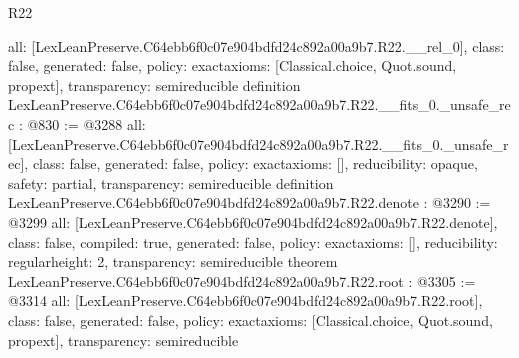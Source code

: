 \begin{lexlean}{R22}
\begin{coremodule}
{  all: [LexLeanPreserve.C64ebb6f0c07e904bdfd24c892a00a9b7.R22.__rel_0],
  class: false,
  generated: false,
  policy: exact{axioms: [Classical.choice, Quot.sound, propext]},
  transparency: semireducible
}
definition LexLeanPreserve.C64ebb6f0c07e904bdfd24c892a00a9b7.R22.__fits_0._unsafe_rec : @830 := @3288 {
  all: [LexLeanPreserve.C64ebb6f0c07e904bdfd24c892a00a9b7.R22.__fits_0._unsafe_rec],
  class: false,
  generated: false,
  policy: exact{axioms: []},
  reducibility: opaque{},
  safety: partial,
  transparency: semireducible
}
definition LexLeanPreserve.C64ebb6f0c07e904bdfd24c892a00a9b7.R22.denote : @3290 := @3299 {
  all: [LexLeanPreserve.C64ebb6f0c07e904bdfd24c892a00a9b7.R22.denote],
  class: false,
  compiled: true,
  generated: false,
  policy: exact{axioms: []},
  reducibility: regular{height: 2},
  transparency: semireducible
}
theorem LexLeanPreserve.C64ebb6f0c07e904bdfd24c892a00a9b7.R22.root : @3305 := @3314 {
  all: [LexLeanPreserve.C64ebb6f0c07e904bdfd24c892a00a9b7.R22.root],
  class: false,
  generated: false,
  policy: exact{axioms: [Classical.choice, Quot.sound, propext]},
  transparency: semireducible
}


\end{coremodule}
\end{lexlean}

